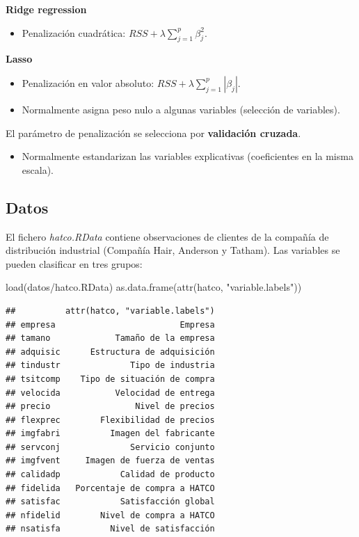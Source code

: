 \documentclass[
]{book}
\newenvironment{Shaded}{\begin{snugshade}}{\end{snugshade}}
\newcommand{\FunctionTok}[1]{\textcolor[rgb]{0.00,0.00,0.00}{#1}}
\newcommand{\NormalTok}[1]{#1}
\newcommand{\StringTok}[1]{\textcolor[rgb]{0.31,0.60,0.02}{#1}}
\providecommand{\tightlist}{%
  \setlength{\itemsep}{0pt}\setlength{\parskip}{0pt}}
\theoremstyle{break}
\theoremstyle{nonumberplain}
\begin{document}
\textbf{Ridge regression}

\begin{itemize}
\tightlist
\item
  Penalización cuadrática: \(RSS+\lambda\sum_{j=1}^{p}\beta_{j}^{2}\).
\end{itemize}

\textbf{Lasso}

\begin{itemize}
\item
  Penalización en valor absoluto: \(RSS+\lambda\sum_{j=1}^{p}|\beta_{j}|\).
\item
  Normalmente asigna peso nulo a algunas variables
  (selección de variables).
\end{itemize}

El parámetro de penalización se selecciona por \textbf{validación cruzada}.

\begin{itemize}
\tightlist
\item
  Normalmente estandarizan las variables explicativas
  (coeficientes en la misma escala).
\end{itemize}

\hypertarget{datos}{%
\subsection{Datos}\label{datos}}

El fichero \emph{hatco.RData} contiene observaciones de clientes de la compañía de
distribución industrial (Compañía Hair, Anderson y Tatham).
Las variables se pueden clasificar en tres grupos:

\begin{Shaded}
\begin{Highlighting}[]
\FunctionTok{load}\NormalTok{(}\StringTok{\textquotesingle{}datos/hatco.RData\textquotesingle{}}\NormalTok{)}
\FunctionTok{as.data.frame}\NormalTok{(}\FunctionTok{attr}\NormalTok{(hatco, }\StringTok{"variable.labels"}\NormalTok{))}
\end{Highlighting}
\end{Shaded}

\begin{verbatim}
##          attr(hatco, "variable.labels")
## empresa                         Empresa
## tamano             Tamaño de la empresa
## adquisic      Estructura de adquisición
## tindustr              Tipo de industria
## tsitcomp    Tipo de situación de compra
## velocida           Velocidad de entrega
## precio                 Nivel de precios
## flexprec        Flexibilidad de precios
## imgfabri          Imagen del fabricante
## servconj              Servicio conjunto
## imgfvent     Imagen de fuerza de ventas
## calidadp            Calidad de producto
## fidelida   Porcentaje de compra a HATCO
## satisfac            Satisfacción global
## nfidelid        Nivel de compra a HATCO
## nsatisfa          Nivel de satisfacción
\end{verbatim}
\end{document}
